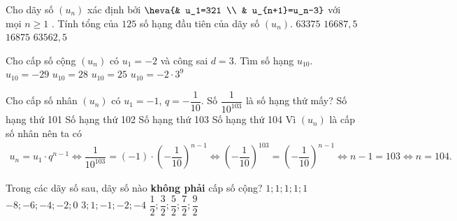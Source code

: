 \begin{ex}%
Cho dãy số $\left( u_n \right)$ xác định bởi $\heva{& u_1=321 \\  & u_{n+1}=u_n-3}$ với mọi $n\ge 1$ . Tính tổng của $125$ số hạng đầu tiên của dãy số $\left(u_n \right)$.
\choice
{$63375$}
{$16687{,}5$}
{\True $16875$}
{$63562{,}5$}
\end{ex}%
\begin{ex}%
Cho cấp số cộng $\left(u_n\right)$ có $u_1=-2$ và công sai $d=3$. Tìm số hạng $u_{10}$.
	\choice
	{$u_{10}=-29$}
	{$u_{10}=28$}
	{\True $u_{10}=25$}
	{$u_{10}=-2\cdot3^9$}
\end{ex}%
\begin{ex}%
	Cho cấp số nhân $\left( u_n\right) $ có $u_{1}=-1$, $q=-\dfrac{1}{10}$. Số $\dfrac{1}{10^{103}}$ là số hạng thứ mấy?
	\choice
	{Số hạng thứ 101}
	{Số hạng thứ 102}
	{Số hạng thứ 103}
	{\True Số hạng thứ 104}
	\loigiai
	{
		Vì $\left(u_n \right) $ là cấp số nhân nên ta có 
		\allowdisplaybreaks
		\begin{eqnarray*}
			u_n=u_1\cdot q^{n-1}\Leftrightarrow \dfrac{1}{10^{103}}=(-1)\cdot \left(-\dfrac{1}{10} \right)^{n-1} \Leftrightarrow \left(-\dfrac{1}{10} \right)^{103}=\left(-\dfrac{1}{10} \right)^{n-1}\Leftrightarrow n-1=103\Leftrightarrow n=104.
		\end{eqnarray*}
	}
\end{ex}%
\begin{ex}%
	Trong các dãy số sau, dãy số nào \textbf{không phải} cấp số cộng?
	\choice
	{$1;1;1;1;1$}
	{$-8;-6;-4;-2;0$}
	{\True $3;1;-1;-2;-4$}
	{$\dfrac{1}{2}; \dfrac{3}{2}; \dfrac{5}{2}; \dfrac{7}{2}; \dfrac{9}{2}$}
\end{ex}%
